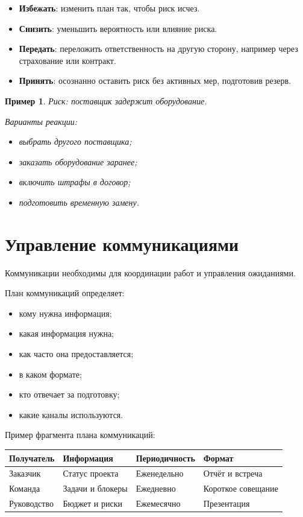 \documentclass[12pt,a4paper]{article}
\newtheorem{example}{Пример}
\begin{document}
\begin{itemize}
    \item \textbf{Избежать}: изменить план так, чтобы риск исчез.
    \item \textbf{Снизить}: уменьшить вероятность или влияние риска.
    \item \textbf{Передать}: переложить ответственность на другую сторону, например через страхование или контракт.
    \item \textbf{Принять}: осознанно оставить риск без активных мер, подготовив резерв.
\end{itemize}

\begin{example}
Риск: поставщик задержит оборудование.

Варианты реакции:
\begin{itemize}
    \item выбрать другого поставщика;
    \item заказать оборудование заранее;
    \item включить штрафы в договор;
    \item подготовить временную замену.
\end{itemize}
\end{example}

\section{Управление коммуникациями}

Коммуникации необходимы для координации работ и управления ожиданиями.

План коммуникаций определяет:
\begin{itemize}
    \item кому нужна информация;
    \item какая информация нужна;
    \item как часто она предоставляется;
    \item в каком формате;
    \item кто отвечает за подготовку;
    \item какие каналы используются.
\end{itemize}

Пример фрагмента плана коммуникаций:

\begin{center}
\begin{tabular}{|p{3cm}|p{3cm}|p{3cm}|p{3cm}|}
\hline
Получатель & Информация & Периодичность & Формат \\
\hline
Заказчик & Статус проекта & Еженедельно & Отчёт и встреча \\
\hline
Команда & Задачи и блокеры & Ежедневно & Короткое совещание \\
\hline
Руководство & Бюджет и риски & Ежемесячно & Презентация \\
\hline
\end{tabular}
\end{center}
\end{document}
